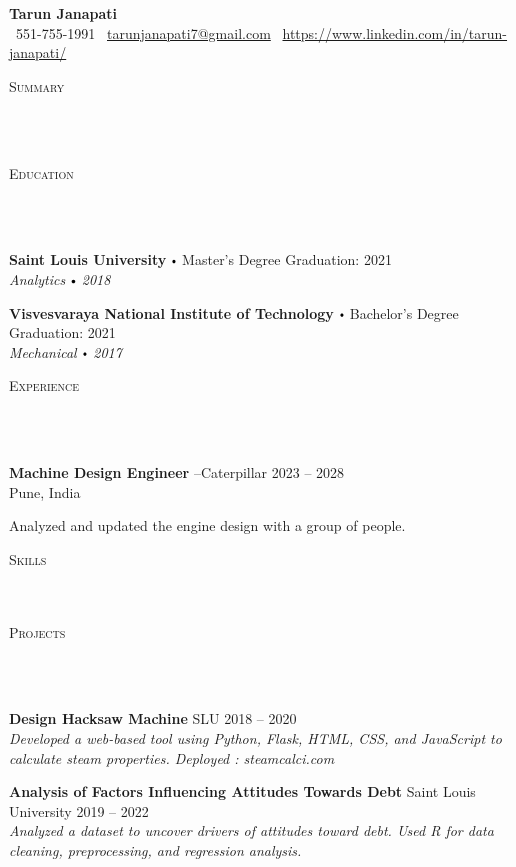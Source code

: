 \documentclass{article}
\newcommand{\school}[4]{
      \textbf{#1} \labelitemi #2 \hfill #3 \\ #4 \vspace*{5pt}
    }
\newcommand{\employer}[4]{{
      \vspace*{2pt}%
      \textbf{#1} #2 \hfill #3\\ #4 \vspace*{2pt}}
      }
\newcommand{\project}[4]{{
        \vspace*{2pt}%
        \textbf{#1} #2 \hfill #3\\ \textit{#4} \vspace*{2pt}}
        }
\newcommand{\lineunder}{
      \vspace*{-8pt} \\ \hspace*{-18pt} 
      \hrulefill \\
      }
\newcommand{\header}[1]{{
      \hspace*{-15pt}\vspace*{6pt} \textsc{#1}} \vspace*{-6pt} 
      \lineunder
      }
\renewcommand{\labelitemi}{
      $\vcenter{\hbox{\tiny$\bullet$}}$\hspace*{3pt}
      }
\renewcommand{\labelitemii}{
      $\vcenter{\hbox{\tiny$\bullet$}}$\hspace*{-3pt}
      }
\newenvironment{bullet-list-minor}{
        \begin{list}{\labelitemii}{\setlength\leftmargin{15pt} 
          \topsep 0pt \itemsep -2pt}}{\vspace*{4pt}\end{list}
          }
\begin{document}
    \small
    \smallskip
    \vspace*{-44pt}

    \begin{center}
      {\LARGE \textbf{Tarun Janapati}} \\
      \faPhone\ 551-755-1991 \quad
      \faEnvelope\ \href{mailto:tarunjanapati7@gmail.com}{tarunjanapati7@gmail.com} \quad
      \faLinkedin\ \url{https://www.linkedin.com/in/tarun-janapati/}
    \end{center}
   \vspace*{4pt}%
    \header{Summary}

    {}

    \vspace{15pt}

   \header{Education}

    {
      \school{Saint Louis University}{Master's Degree}{Graduation: 2021}{\textit{Analytics \labelitemi 2018}}
      

      \school{Visvesvaraya National Institute of Technology}{Bachelor's Degree}{Graduation: 2021}{\textit{Mechanical \labelitemi 2017}}
      }

    \vspace*{4pt}%
    \header{Experience}

    {
        \employer{Machine Design Engineer}{--Caterpillar}{2023 -- 2028}{Pune, India}
        \begin{bullet-list-minor}
	      \item Analyzed and updated the engine design with a group of people.
        \end{bullet-list-minor}
       
      }
    \vspace*{4pt}%
    \header{Skills}

    \vspace*{4pt}%
    \header{Projects}
    {
      \project{Design Hacksaw Machine}{SLU}{2018 -- 2020}{Developed a web-based tool using Python, Flask, HTML, CSS, and JavaScript to calculate steam properties.
Deployed : steamcalci.com}
      

      \project{Analysis of Factors Influencing Attitudes Towards Debt}{Saint Louis University}{2019 -- 2022}{Analyzed a dataset to uncover drivers of attitudes toward debt. Used R for data cleaning, preprocessing, and
regression analysis.}
      }
\end{document}
